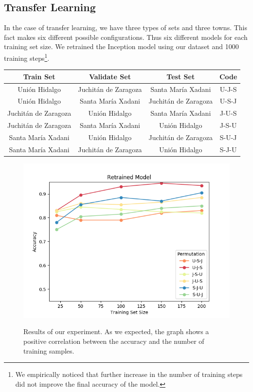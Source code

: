 \subsection{Transfer Learning}

In the case of transfer learning, we have three types of sets and three towns. This fact makes six different possible configurations. Thus six different models for each training set size. We retrained the Inception model using our dataset and 1000 training steps\footnote{We empirically noticed that further increase in the number of training steps did not improve the final accuracy of the model.}.\\

\begin{center}
  \begin{tabular}{|c|c|c|c|}
    \hline
    Train Set              &Validate Set           &Test Set               &Code  \\ \hline
    Uni\'on Hidalgo        &Juchit\'an de Zaragoza &Santa Mar\'ia Xadani   &U-J-S \\ \hline
    Uni\'on Hidalgo        &Santa Mar\'ia Xadani   &Juchit\'an de Zaragoza &U-S-J \\ \hline
    Juchit\'an de Zaragoza &Uni\'on Hidalgo        &Santa Mar\'ia Xadani   &J-U-S \\ \hline
    Juchit\'an de Zaragoza &Santa Mar\'ia Xadani   &Uni\'on Hidalgo        &J-S-U \\ \hline
    Santa Mar\'ia Xadani   &Uni\'on Hidalgo        &Juchit\'an de Zaragoza &S-U-J \\ \hline
    Santa Mar\'ia Xadani   &Juchit\'an de Zaragoza &Uni\'on Hidalgo        &S-J-U \\
    \hline
  \end{tabular}
\end{center}

\begin{figure}[h]
  \centering
  \includegraphics[width=1\textwidth]{images/validation-plot.png}
  \label{fig:validaton-plot}
  \caption{Results of our experiment. As we expected, the graph shows a positive correlation between the accuracy and the number of training samples.}
\end{figure}

